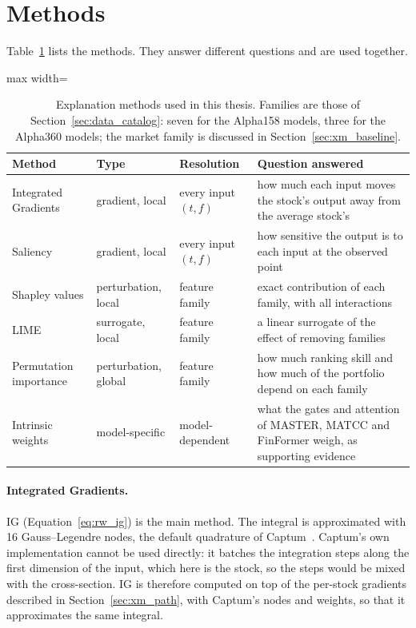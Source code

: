\section{Methods}
\label{sec:xm_methods}

Table~\ref{tab:xm_methods} lists the methods. They answer different questions and are used together.

\begin{table}[htbp]
    \centering
    \small
    \begin{adjustbox}{max width=\textwidth}
    \begin{tabular}{@{}lllp{6.2cm}@{}}
        \toprule
        \textbf{Method} & \textbf{Type} & \textbf{Resolution} & \textbf{Question answered} \\
        \midrule
        Integrated Gradients & gradient, local & every input $(t, f)$ & how much each input moves the stock's output away from the average stock's \\
        Saliency & gradient, local & every input $(t, f)$ & how sensitive the output is to each input at the observed point \\
        Shapley values & perturbation, local & feature family & exact contribution of each family, with all interactions \\
        LIME & surrogate, local & feature family & a linear surrogate of the effect of removing families \\
        Permutation importance & perturbation, global & feature family & how much ranking skill and how much of the portfolio depend on each family \\
        Intrinsic weights & model-specific & model-dependent & what the gates and attention of MASTER, MATCC and FinFormer weigh, as supporting evidence \\
        \bottomrule
    \end{tabular}
    \end{adjustbox}
    \caption{Explanation methods used in this thesis. Families are those of Section~\ref{sec:data_catalog}: seven for the Alpha158 models, three for the Alpha360 models; the market family is discussed in Section~\ref{sec:xm_baseline}.}
    \label{tab:xm_methods}
\end{table}

\paragraph{Integrated Gradients.} IG (Equation~\ref{eq:rw_ig}) is the main method. The integral is approximated with 16 Gauss--Legendre nodes, the default quadrature of Captum~\cite{kokhlikyan2020captum}. Captum's own implementation cannot be used directly: it batches the integration steps along the first dimension of the input, which here is the stock, so the steps would be mixed with the cross-section. IG is therefore computed on top of the per-stock gradients described in Section~\ref{sec:xm_path}, with Captum's nodes and weights, so that it approximates the same integral.

